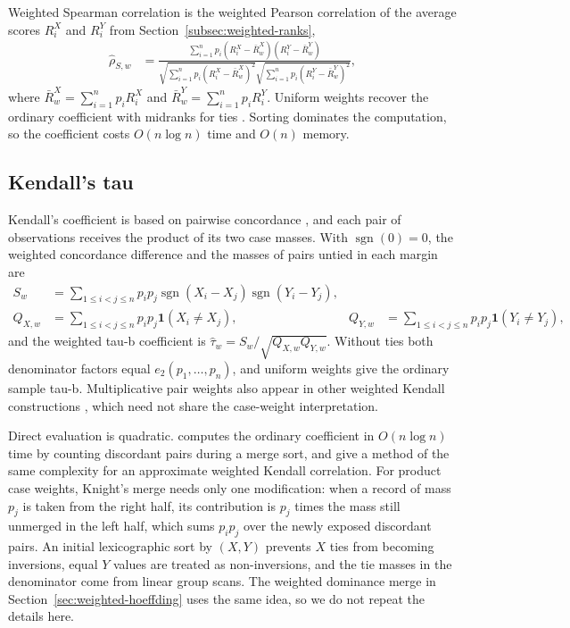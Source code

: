 Weighted Spearman correlation is the weighted Pearson correlation of the
average scores $R_i^X$ and $R_i^Y$ from Section~\ref{subsec:weighted-ranks},
\begin{align*}
    \widehat\rho_{S,w}
    &= \frac{\sum_{i=1}^n p_i(R_i^X-\bar R_w^X)(R_i^Y-\bar R_w^Y)}
            {\sqrt{\sum_{i=1}^n p_i(R_i^X-\bar R_w^X)^2}
             \sqrt{\sum_{i=1}^n p_i(R_i^Y-\bar R_w^Y)^2}},
\end{align*}
where $\bar R_w^X=\sum_{i=1}^n p_iR_i^X$ and
$\bar R_w^Y=\sum_{i=1}^n p_iR_i^Y$. Uniform weights recover the ordinary coefficient with midranks for ties
\citep{spearman1904}. Sorting dominates the computation, so the coefficient
costs $O(n\log n)$ time and $O(n)$ memory.

\subsection{Kendall's tau}

Kendall's coefficient is based on pairwise concordance \citep{kendall1938},
and each pair of observations receives the product of its two case masses.
With $\operatorname{sgn}(0)=0$, the weighted concordance difference and the
masses of pairs untied in each margin are
\begin{align*}
    S_w
    &= \sum_{1\leq i<j\leq n}p_ip_j
       \operatorname{sgn}(X_i-X_j)\operatorname{sgn}(Y_i-Y_j),\\
    Q_{X,w}
    &= \sum_{1\leq i<j\leq n}p_ip_j\mathbf{1}(X_i\neq X_j),
    &
    Q_{Y,w}
    &= \sum_{1\leq i<j\leq n}p_ip_j\mathbf{1}(Y_i\neq Y_j),
\end{align*}
and the weighted tau-b coefficient is
$\widehat\tau_w = S_w/\sqrt{Q_{X,w}Q_{Y,w}}$. Without ties both denominator
factors equal $e_2(p_1,\ldots,p_n)$, and uniform weights give the ordinary
sample tau-b. Multiplicative pair weights also appear in other weighted Kendall
constructions \citep{shieh1998}, which need not share the case-weight
interpretation.

Direct evaluation is quadratic. \citet{knight1966} computes the ordinary
coefficient in $O(n\log n)$ time by counting discordant pairs during a merge
sort, and \citet{lin2018} give a method of the same complexity for an
approximate weighted Kendall correlation. For product case weights, Knight's
merge needs only one modification: when a record of mass $p_j$ is taken from
the right half, its contribution is $p_j$ times the mass still unmerged in the
left half, which sums $p_ip_j$ over the newly exposed discordant pairs. An
initial lexicographic sort by $(X,Y)$ prevents $X$ ties from becoming
inversions, equal $Y$ values are treated as non-inversions, and the tie masses
in the denominator come from linear group scans. The weighted dominance merge
in Section~\ref{sec:weighted-hoeffding} uses the same idea, so we do not
repeat the details here.

